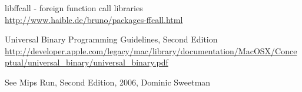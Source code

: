 \begin{thebibliography}{99}
	libffcall - foreign function call libraries\\
	\url{http://www.haible.de/bruno/packages-ffcall.html}

	Universal Binary Programming Guidelines, Second Edition\\
	\url{http://developer.apple.com/legacy/mac/library/documentation/MacOSX/Conceptual/universal\_binary/universal\_binary.pdf}

	See Mips Run, Second Edition, 2006, Dominic Sweetman

\end{thebibliography}

